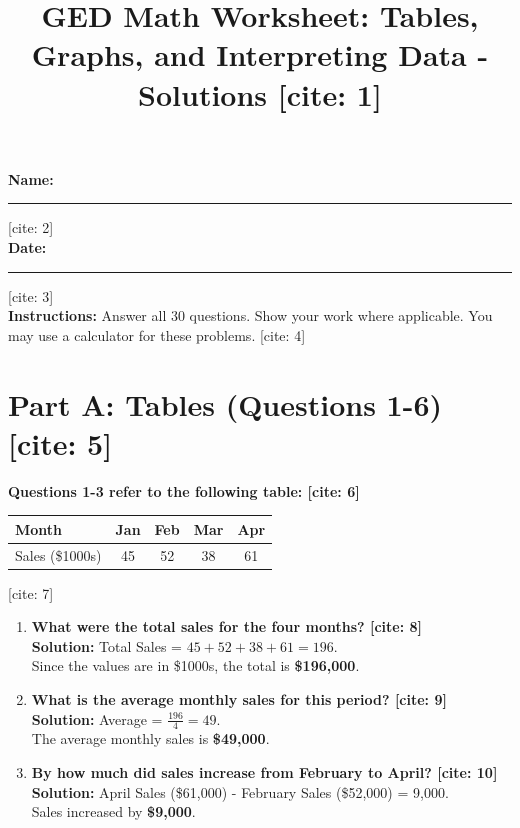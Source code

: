\documentclass[11pt]{article}
\title{GED Math Worksheet: Tables, Graphs, and Interpreting Data - Solutions [cite: 1]}
\author{}
\date{}
\begin{document}
\maketitle

\noindent\textbf{Name:} \rule{5cm}{0.4pt} [cite: 2]\\
\textbf{Date:} \rule{5cm}{0.4pt} [cite: 3]\\

\noindent\textbf{Instructions:} Answer all 30 questions. Show your work where applicable. You may use a calculator for these problems. [cite: 4]

\vspace{0.5cm}

\section*{Part A: Tables (Questions 1-6) [cite: 5]}

\noindent \textbf{Questions 1-3 refer to the following table: [cite: 6]}

\begin{table}[h]
\centering
\begin{tabular}{lcccc}
\toprule
\textbf{Month} & \textbf{Jan} & \textbf{Feb} & \textbf{Mar} & \textbf{Apr} \\ \midrule
Sales (\$1000s) & 45 & 52 & 38 & 61 \\ \bottomrule
\end{tabular}
\end{table}
\vspace{0.2cm} [cite: 7]

\begin{enumerate}
    \item \textbf{What were the total sales for the four months? [cite: 8]} \\
    \textbf{Solution:} Total Sales = $45 + 52 + 38 + 61 = 196$. \\
    Since the values are in \$1000s, the total is \textbf{\$196,000}.
    
    \item \textbf{What is the average monthly sales for this period? [cite: 9]} \\
    \textbf{Solution:} Average = $\frac{196}{4} = 49$. \\
    The average monthly sales is \textbf{\$49,000}.
    
    \item \textbf{By how much did sales increase from February to April? [cite: 10]} \\
    \textbf{Solution:} April Sales (\$61,000) - February Sales (\$52,000) = 9,000. \\
    Sales increased by \textbf{\$9,000}.
\end{enumerate}
\end{document}

